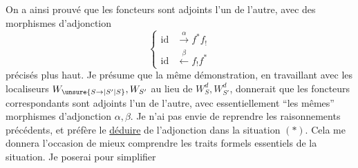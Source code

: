 
On a ainsi prouvé que les foncteurs
sont adjoints l'un de l'autre, avec des morphismes d'adjonction
\[
 \left\{\begin{aligned}
 \mathrm{id}&\xrightarrow{\alpha} f^*f_!\\
 \mathrm{id}&\xleftarrow{\beta} f_!f^*
 \end{aligned}\right.
\]
précisés plus haut. Je présume que la même démonstration, en travaillant avec les  localiseurs  $W_{\unsure{S\to|S'|S}},W_{S'}$ au lieu de $W_S^d,W_{S'}^d$, donnerait que les foncteurs correspondants
sont adjoints l'un de l'autre, avec essentiellement ``les mêmes'' morphismes d'adjonction $\alpha,\beta$. Je n'ai pas envie de reprendre les raisonnements précédents, et préfère le  \uline{déduire} de l'adjonction dans la situation $(*)$. Cela me donnera l'occasion de mieux comprendre les traits formels essentiels de la situation. Je poserai pour simplifier

